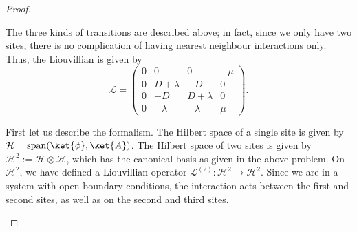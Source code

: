 \begin{proof}
	\begin{parts}
	\item The three kinds of transitions are described above; in fact, since we only have two sites, there is no complication of having nearest neighbour interactions only. Thus, the Liouvillian is given by
		\[
			\mathcal{L}= \begin{pmatrix} 0 & 0 & 0 & -\mu \\
				0 & D+\lambda & -D & 0\\
				0 & -D & D+\lambda & 0 \\
				0 & -\lambda & -\lambda & \mu
			\end{pmatrix} 
		.\] 
	\item First let us describe the formalism. The Hilbert space of a single site is given by $\mathcal{H}=\text{span}(\ket{\phi},\ket{A}) $. The Hilbert space of two sites is given by $\mathcal{H}^2 := \mathcal{H}\otimes \mathcal{H}$, which has the canonical basis as given in the above problem. On $\mathcal{H}^2$, we have defined a Liouvillian operator $\mathcal{L}^{(2)}:\mathcal{H}^2 \to \mathcal{H}^2$. Since we are in a system with open boundary conditions, the interaction acts between the first and second sites, as well as on the second and third sites.



\end{parts}
\end{proof}
